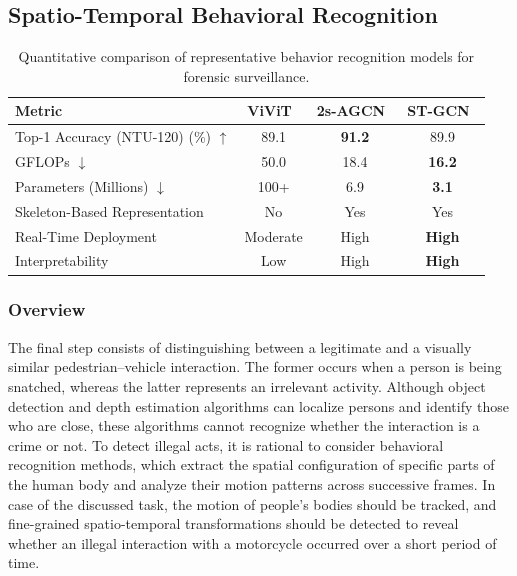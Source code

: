\documentclass[conference]{IEEEtran}
\begin{document}
\subsection{Spatio-Temporal Behavioral Recognition}

\begin{table}[!t]
\centering
\scriptsize
\renewcommand{\arraystretch}{1.2}
\caption{Quantitative comparison of representative behavior recognition models for forensic surveillance.}
\label{tab:behavior_quantitative}

\begin{tabular}{|l|c|c|c|}
\hline
\textbf{Metric} &
\textbf{ViViT~\cite{liu2022video}} &
\textbf{2s-AGCN~\cite{shi2019twostreamagcn}} &
\textbf{ST-GCN~\cite{yan2018stgcn}} \\ \hline

Top-1 Accuracy (NTU-120) (\%) $\uparrow$ &
89.1 &
\textbf{91.2} &
89.9 \\ \hline

GFLOPs $\downarrow$ &
50.0 &
18.4 &
\textbf{16.2} \\ \hline

Parameters (Millions) $\downarrow$ &
100+ &
6.9 &
\textbf{3.1} \\ \hline

Skeleton-Based Representation &
No &
Yes &
Yes \\ \hline

Real-Time Deployment &
Moderate &
High &
\textbf{High} \\ \hline

Interpretability &
Low &
High &
\textbf{High} \\ \hline

\end{tabular}
\end{table}

\subsubsection{Overview}

The final step consists of distinguishing between a legitimate and a visually similar pedestrian–vehicle interaction. The former occurs when a person is being snatched, whereas the latter represents an irrelevant activity. Although object detection and depth estimation algorithms can localize persons and identify those who are close, these algorithms cannot recognize whether the interaction is a crime or not. To detect illegal acts, it is rational to consider behavioral recognition methods, which extract the spatial configuration of specific parts of the human body and analyze their motion patterns across successive frames. In case of the discussed task, the motion of people’s bodies should be tracked, and fine-grained spatio-temporal transformations should be detected to reveal whether an illegal interaction with a motorcycle occurred over a short period of time.
\end{document}
